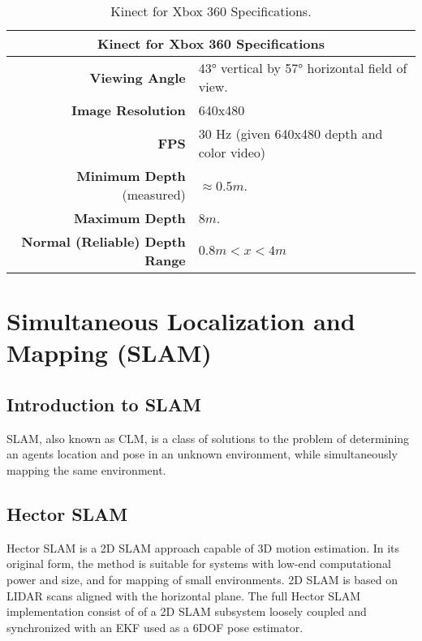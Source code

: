 \begin{table}
	\centering
	\begin{tabular}{ r | p{6.8cm} }
		\hline
		\multicolumn{2}{c}{Kinect for Xbox 360 Specifications}\\
		\hline
		\textbf{Viewing Angle} & 43° vertical by 57° horizontal field of view. \\
		\hline
		\textbf{Image Resolution} & 640x480 \\
		\hline
		\textbf{FPS} & 30 Hz (given 640x480 depth and color video)\\
		\hline
		\textbf{Minimum Depth} (measured) & $\approx 0.5m$.\\
		\hline
		\textbf{Maximum Depth} & $8 m$.\\
		\hline
		\textbf{Normal (Reliable) Depth Range} & $0.8m < x < 4m$\\
		\hline\hline
	\end{tabular}
	\caption{Kinect for Xbox 360 Specifications.}\label{tab:kinect}
\end{table}



\section{Simultaneous Localization and Mapping (SLAM)}

\subsection{Introduction to SLAM}

\ac{SLAM}, also known as \ac{CLM}, is a class of solutions to the problem of determining an agents location and pose in an unknown environment, while simultaneously mapping the same environment.

\subsection{Hector SLAM}
\label{sec:hector}
Hector SLAM \cite{KohlbrecherMeyerStrykKlingaufFlexibleSlamSystem2011} is a 2D \ac{SLAM} approach capable of 3D motion estimation. In its original form, the method is suitable for systems with low-end computational power and size, and for mapping of small environments. 2D \ac{SLAM} is based on \ac{LIDAR} scans aligned with the horizontal plane. The full Hector SLAM implementation consist of of a 2D \ac{SLAM} subsystem loosely coupled and synchronized with an \ac{EKF} used as a  6DOF pose estimator. 

